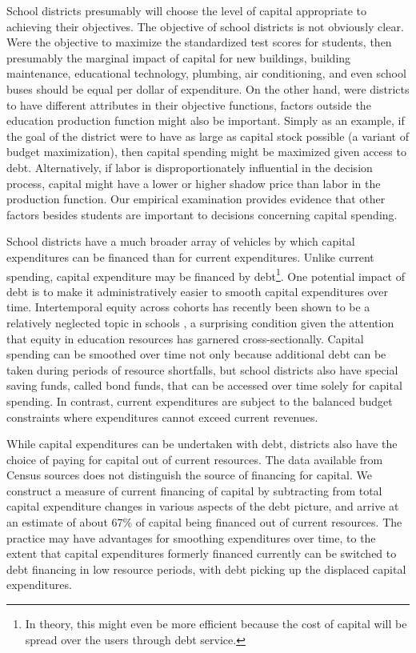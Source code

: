 School districts presumably will choose the level of capital appropriate to achieving their objectives. The objective of school districts is not obviously clear. Were the objective to maximize the standardized test scores for students, then presumably the marginal impact of capital for new buildings, building maintenance, educational technology, plumbing, air conditioning, and even school buses should be equal per dollar of expenditure. On the other hand, were districts to have different attributes in their objective functions, factors outside the education production function might also be important. Simply as an example, if the goal of the district were to have as large as capital stock possible (a variant of budget maximization), then capital spending might be maximized given access to debt. Alternatively, if labor is disproportionately influential in the decision process, capital might have a lower or higher shadow price than labor in the production function. Our empirical examination provides evidence that other factors besides students are important to decisions concerning capital spending.

School districts have a much broader array of vehicles by which capital expenditures can be financed than for current expenditures. Unlike current spending, capital expenditure may be financed by debt\footnote{In theory, this might even be more efficient because the cost of capital will be spread over the users through debt service.}. One potential impact of debt is to make it administratively easier to smooth capital expenditures over time. Intertemporal equity across cohorts has recently been shown to be a relatively neglected topic in schools \cite{biolsi_inequality_2022}, a surprising condition given the attention that equity in education resources has garnered cross-sectionally. Capital spending can be smoothed over time not only because additional debt can be taken during periods of resource shortfalls, but school districts also have special saving funds, called bond funds, that can be accessed over time solely for capital spending. In contrast, current expenditures are subject to the balanced budget constraints where expenditures cannot exceed current revenues.

While capital expenditures can be undertaken with debt, districts also have the choice of paying for capital out of current resources. The data available from Census sources does not distinguish the source of financing for capital. We construct a measure of current financing of capital by subtracting from total capital expenditure changes in various aspects of the debt picture, and arrive at an estimate of about 67\% of capital being financed out of current resources. The practice may have advantages for smoothing expenditures over time, to the extent that capital expenditures formerly financed currently can be switched to debt financing in low resource periods, with debt picking up the displaced capital expenditures. 

